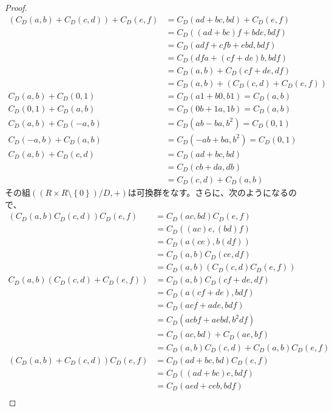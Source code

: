 \documentclass[dvipdfmx]{jsarticle}
\begin{document}
\begin{proof}
\begin{align*}
\left( C_{D}(a,b) + C_{D}(c,d) \right) + C_{D}(e,f) &= C_{D}(ad + bc,bd) + C_{D}(e,f)\\
&= C_{D}\left( (ad + bc)f + bde,bdf \right)\\
&= C_{D}(adf + cfb + ebd,bdf)\\
&= C_{D}\left( dfa + (cf + de)b,bdf \right)\\
&= C_{D}(a,b) + C_{D}(cf + de,df)\\
&= C_{D}(a,b) + \left( C_{D}(c,d) + C_{D}(e,f) \right)\\
C_{D}(a,b) + C_{D}(0,1) &= C_{D}(a1 + b0,b1) = C_{D}(a,b)\\
C_{D}(0,1) + C_{D}(a,b) &= C_{D}(0b + 1a,1b) = C_{D}(a,b)\\
C_{D}(a,b) + C_{D}( - a,b) &= C_{D}\left( ab - ba,b^{2} \right) = C_{D}(0,1)\\
C_{D}( - a,b) + C_{D}(a,b) &= C_{D}\left( - ab + ba,b^{2} \right) = C_{D}(0,1)\\
C_{D}(a,b) + C_{D}(c,d) &= C_{D}(ad + bc,bd)\\
&= C_{D}(cb + da,db)\\
&= C_{D}(c,d) + C_{D}(a,b)
\end{align*}
その組$\left( {\left( R \times R \setminus \left\{ 0 \right\} \right)}/{D}, + \right)$は可換群をなす。さらに、次のようになるので、
\begin{align*}
\left( C_{D}(a,b)C_{D}(c,d) \right)C_{D}(e,f) &= C_{D}(ac,bd)C_{D}(e,f)\\
&= C_{D}\left( (ac)e,(bd)f \right)\\
&= C_{D}\left( a(ce),b(df) \right)\\
&= C_{D}(a,b)C_{D}(ce,df)\\
&= C_{D}(a,b)\left( C_{D}(c,d)C_{D}(e,f) \right)\\
C_{D}(a,b)\left( C_{D}(c,d) + C_{D}(e,f) \right) &= C_{D}(a,b)C_{D}(cf + de,df)\\
&= C_{D}\left( a(cf + de),bdf \right)\\
&= C_{D}(acf + ade,bdf)\\
&= C_{D}\left( acbf + aebd,b^{2}df \right)\\
&= C_{D}(ac,bd) + C_{D}(ae,bf)\\
&= C_{D}(a,b)C_{D}(c,d) + C_{D}(a,b)C_{D}(e,f)\\
\left( C_{D}(a,b) + C_{D}(c,d) \right)C_{D}(e,f) &= C_{D}(ad + bc,bd)C_{D}(e,f)\\
&= C_{D}\left( (ad + bc)e,bdf \right)\\
&= C_{D}(aed + ceb,bdf)\\

\end{align*}
\end{proof}
\end{document}
